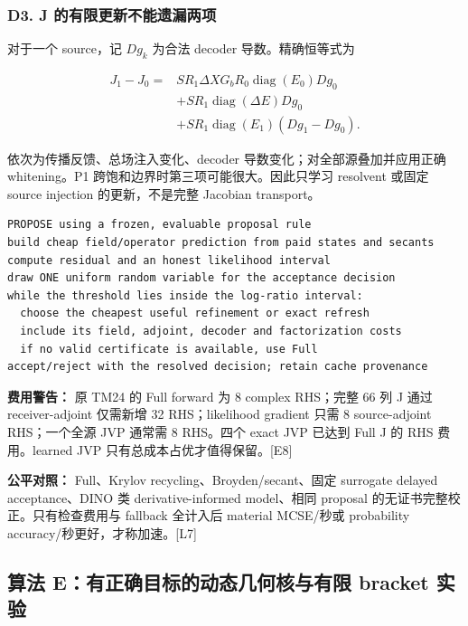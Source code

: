 \documentclass[
  11pt,
  a4paper,
]{article}
\begin{document}
\hypertarget{d3.-j-ux7684ux6709ux9650ux66f4ux65b0ux4e0dux80fdux9057ux6f0fux4e24ux9879}{%
\subsubsection{D3. J
的有限更新不能遗漏两项}\label{d3.-j-ux7684ux6709ux9650ux66f4ux65b0ux4e0dux80fdux9057ux6f0fux4e24ux9879}}

对于一个 source，记 \(Dg_k\) 为合法 decoder 导数。精确恒等式为

\[\begin{aligned}
J_1-J_0={}&S R_1\Delta XG_bR_0\operatorname{diag}(E_0)Dg_0\\
&+S R_1\operatorname{diag}(\Delta E)Dg_0\\
&+S R_1\operatorname{diag}(E_1)(Dg_1-Dg_0).
\end{aligned}\]

依次为传播反馈、总场注入变化、decoder 导数变化；对全部源叠加并应用正确
whitening。P1 跨饱和边界时第三项可能很大。因此只学习 resolvent 或固定
source injection 的更新，不是完整 Jacobian transport。

\begin{verbatim}
PROPOSE using a frozen, evaluable proposal rule
build cheap field/operator prediction from paid states and secants
compute residual and an honest likelihood interval
draw ONE uniform random variable for the acceptance decision
while the threshold lies inside the log-ratio interval:
  choose the cheapest useful refinement or exact refresh
  include its field, adjoint, decoder and factorization costs
  if no valid certificate is available, use Full
accept/reject with the resolved decision; retain cache provenance
\end{verbatim}

\textbf{费用警告：} 原 TM24 的 Full forward 为 8 complex RHS；完整 66 列
J 通过 receiver-adjoint 仅需新增 32 RHS；likelihood gradient 只需 8
source-adjoint RHS；一个全源 JVP 通常需 8 RHS。四个 exact JVP 已达到
Full J 的 RHS 费用。learned JVP 只有总成本占优才值得保留。{[}E8{]}

\textbf{公平对照：} Full、Krylov recycling、Broyden/secant、固定
surrogate delayed acceptance、DINO 类 derivative-informed model、相同
proposal 的无证书完整校正。只有检查费用与 fallback 全计入后 material
MCSE/秒或 probability accuracy/秒更好，才称加速。{[}L7{]}

\hypertarget{ux7b97ux6cd5-eux6709ux6b63ux786eux76eeux6807ux7684ux52a8ux6001ux51e0ux4f55ux6838ux4e0eux6709ux9650-bracket-ux5b9eux9a8c}{%
\subsection{算法 E：有正确目标的动态几何核与有限 bracket
实验}\label{ux7b97ux6cd5-eux6709ux6b63ux786eux76eeux6807ux7684ux52a8ux6001ux51e0ux4f55ux6838ux4e0eux6709ux9650-bracket-ux5b9eux9a8c}}
\end{document}
